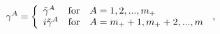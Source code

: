 \begin{equation}
\gamma^A=\left\{
\begin{array}{lll}
\tilde\gamma^A&{\rm for}& A=1,2,...,  m_{+}\\
i\tilde\gamma^A&{\rm for}& A= m_{+}+1,  m_{+}+2,..., m
\end{array}\right.\,,
\end{equation}

